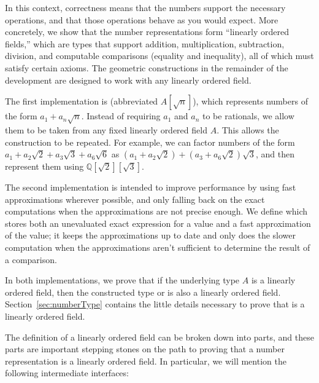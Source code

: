 In this context, correctness means that the numbers support the necessary
operations, and that those operations behave as you would expect. More
concretely, we show that the number representations form ``linearly ordered
fields,'' which are types that support addition, multiplication, subtraction,
division, and computable comparisons (equality and inequality), all of which
must satisfy certain axioms. The geometric constructions in the remainder of
the development are designed to work with any linearly ordered field.

The first implementation is  (abbreviated $A[\sqrt{n}]$),
which represents numbers of the form $a_1 + a_n\sqrt{n}$. Instead of requiring
$a_1$ and $a_n$ to be rationals, we allow them to be taken from any fixed
linearly ordered field $A$.  This allows the construction to be repeated. For
example, we can factor numbers of the form $a_1 + a_2\sqrt{2} + a_3\sqrt{3} +
a_6\sqrt{6}$ as $(a_1 + a_2\sqrt{2}) + (a_3 + a_6\sqrt{2})\sqrt{3}$, and then
represent them using $ℚ[\sqrt{2}][\sqrt{3}]$.

The second implementation is intended to improve performance by using
fast approximations wherever possible, and only falling back on the
exact computations when the approximations are not precise enough. We define
 which stores both an unevaluated exact expression for a
value and a fast approximation of the value; it keeps the approximations up to
date and only does the slower computation when the approximations aren't
sufficient to determine the result of a comparison.

In both implementations, we prove that if the underlying type $A$ is a linearly
ordered field, then the constructed type  or
 is also a linearly ordered field.
Section~\ref{sec:numberType} contains the little details necessary to prove that
 is a linearly ordered field.

The definition of a linearly ordered field can be broken down into parts, and
these parts are important stepping stones on the path to proving that a number
representation is a linearly ordered field. In particular, we will mention the
following intermediate interfaces:

